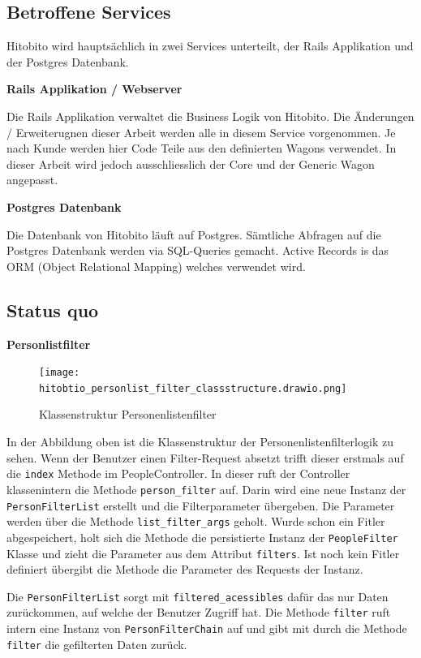 \subsection{Betroffene Services}
Hitobito wird hauptsächlich in zwei Services unterteilt, der Rails Applikation und der Postgres Datenbank.

\textbf{Rails Applikation / Webserver}

Die Rails Applikation verwaltet die Business Logik von Hitobito. Die Änderungen / Erweiterugnen dieser Arbeit
werden alle in diesem Service vorgenommen. Je nach Kunde werden hier Code Teile aus den definierten Wagons verwendet.
In dieser Arbeit wird jedoch ausschliesslich der Core und der Generic Wagon angepasst.

\textbf{Postgres Datenbank}

Die Datenbank von Hitobito läuft auf Postgres. Sämtliche Abfragen auf die Postgres Datenbank werden via SQL-Queries
gemacht. Active Records is das ORM (Object Relational Mapping) welches verwendet wird.

\newpage

\subsection{Status quo}

\textbf{Personlistfilter}

\begin{figure}[h]
   \centering
   \texttt{[image: hitobtio\_personlist\_filter\_classstructure.drawio.png]}
   \caption{Klassenstruktur Personenlistenfilter}
\end{figure}

In der Abbildung oben ist die Klassenstruktur der Personenlistenfilterlogik zu sehen. Wenn der Benutzer einen Filter-Request
absetzt trifft dieser erstmals auf die \texttt{index} Methode im PeopleController. In dieser ruft der Controller klassenintern die Methode
\texttt{person\_filter} auf. Darin wird eine neue Instanz der \texttt{Person\:\:Filter\:\:List} erstellt und die Filterparameter übergeben.
Die Parameter werden über die Methode \texttt{list\_filter\_args} geholt. Wurde schon ein Fitler abgespeichert, holt sich die Methode
die persistierte Instanz der \texttt{PeopleFilter} Klasse und zieht die Parameter aus dem Attribut \texttt{filters}. Ist noch kein Fitler definiert
übergibt die Methode die Parameter des Requests der Instanz. 

Die \texttt{Person\:\:Filter\:\:List} sorgt mit \texttt{filtered\_acessibles} dafür das nur Daten zurückommen, auf welche der Benutzer
Zugriff hat. Die Methode \texttt{filter} ruft intern eine Instanz von \texttt{Person\:\:Filter\:\:Chain} auf und gibt mit durch die Methode \texttt{filter} die
gefilterten Daten zurück.

